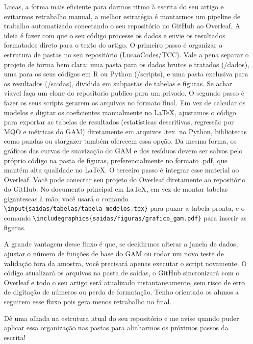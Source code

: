 \documentclass[11pt,a4paper]{article}
\begin{document}
Lucas, a forma mais eficiente para darmos ritmo à escrita do seu artigo e evitarmos retrabalho manual, a melhor estratégia é montarmos um pipeline de trabalho automatizado conectando o seu repositório no GitHub ao Overleaf. A ideia é fazer com que o seu código processe os dados e envie os resultados formatados direto para o texto do artigo.
O primeiro passo é organizar a estrutura de pastas no seu repositório (LucaoCodes/TCC). Vale a pena separar o projeto de forma bem clara: uma pasta para os dados brutos e tratados (/dados), uma para os seus códigos em R ou Python (/scripts), e uma pasta exclusiva para os resultados (/saidas), dividida em subpastas de tabelas e figuras. Se achar viavel faça um clone do repositorio publico para um privado.
O segundo passo é fazer os seus scripts gerarem os arquivos no formato final. Em vez de calcular os modelos e digitar os coeficientes manualmente no LaTeX, ajustamos o código para exportar as tabelas de resultados (estatísticas descritivas, regressão por MQO e métricas do GAM) diretamente em arquivos .tex. no Python, bibliotecas como pandas ou stargazer também oferecem essa opção. Da mesma forma, os gráficos das curvas de suavização do GAM e dos resíduos devem ser salvos pelo próprio código na pasta de figuras, preferencialmente no formato .pdf, que mantém alta qualidade no LaTeX.
O terceiro passo é integrar esse material ao Overleaf. Você pode conectar seu projeto do Overleaf diretamente ao repositório do GitHub. No documento principal em LaTeX, em vez de montar tabelas gigantescas à mão, você usará o comando \texttt{\textbackslash input\{saidas/tabelas/tabela\_modelos.tex\}} para puxar a tabela pronta, e o comando \texttt{\textbackslash includegraphics\{saidas/figuras/grafico\_gam.pdf\}} para inserir as figuras.

A grande vantagem desse fluxo é que, se decidirmos alterar a janela de dados, ajustar o número de funções de base do GAM ou rodar um novo teste de validação fora da amostra, você precisará apenas executar o script novamente. 
O código atualizará os arquivos na pasta de saídas, o GitHub sincronizará com o Overleaf e todo o seu artigo será atualizado instantaneamente, sem risco de erro de digitação de números ou perda de formatação. Tenho orientado os alunos a seguirem esse fluxo pois gera menos retrabalho no final.

Dê uma olhada na estrutura atual do seu repositório e me avise quando puder aplicar essa organização nas pastas para alinharmos os próximos passos da escrita!
\end{document}
